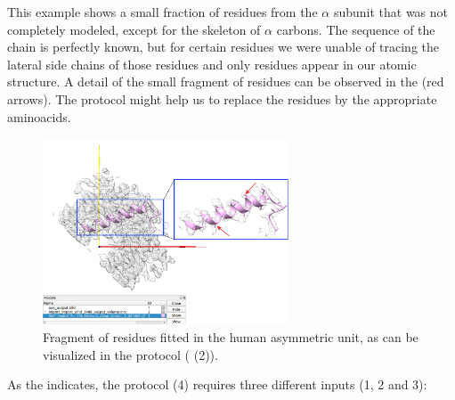   This example shows a small fraction of residues from the  $\alpha$ subunit that was not completely modeled, except for the skeleton of $\alpha$ carbons. The sequence of the chain is perfectly known, but for certain residues we were unable of tracing the lateral side chains of those residues and only  residues appear in our atomic structure. A detail of the small fragment of  residues can be observed in the  (red arrows). The protocol \phenix {} might help us to replace the  residues by the appropriate aminoacids.
  
   \begin{figure}[H]
  \centering 
  \captionsetup{width=.9\linewidth} 
  \includegraphics[width=0.65\textwidth]{Images/Fig_search_fit_2.pdf}
  \caption{Fragment of  residues fitted in the human  asymmetric unit, as can be visualized in the protocol \chimera {} ( (2)).}
  \label{fig:phenix_search_fit_2}
  \end{figure}
  
  As the  indicates, the protocol  (4) requires three different inputs (1, 2 and 3):
  
